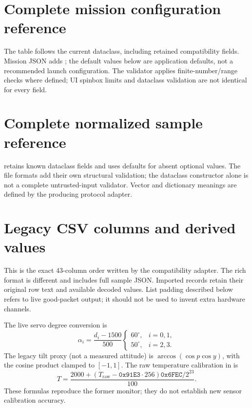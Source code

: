 \section{Complete mission configuration reference}\label{app:mission}
The table follows the current  dataclass, including retained
compatibility fields. Mission JSON adds ; the default
values below are application defaults, not a recommended launch configuration.
The validator applies finite-number/range checks where defined; UI spinbox
limits and dataclass validation are not identical for every field.


\section{Complete normalized sample reference}\label{app:sample}
 retains known dataclass fields and uses defaults for
absent optional values. The file formats add their own structural validation;
the dataclass constructor alone is not a complete untrusted-input validator.
Vector and dictionary meanings are defined by the producing protocol adapter.


\section{Legacy CSV columns and derived values}\label{app:csv}
This is the exact 43-column order written by the compatibility adapter.
The rich  format is different and includes full
sample JSON. Imported records retain their original row text and available
decoded values. List padding described below refers to live good-packet output;
it should not be used to invent extra hardware channels.


The live servo degree conversion is
\[
 \alpha_i=\frac{d_i-1500}{500}
 \begin{cases}60^\circ,& i=0,1,\\50^\circ,& i=2,3.\end{cases}
\]
The legacy tilt proxy (not a measured attitude) is
\(\arccos(\cos p\cos y)\), with the cosine product clamped to \([-1,1]\).
The raw temperature calibration in  is
\[
 T=\frac{2000+(T_{\mathrm{raw}}-\texttt{0x91E3}\cdot256)
                    \texttt{0x6FEC}/2^{23}}{100}.
\]
These formulas reproduce the former monitor; they do not establish new sensor
calibration accuracy.

